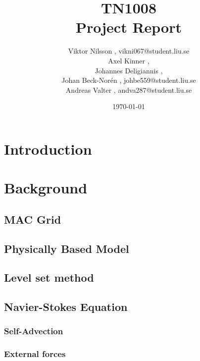 \documentclass[]{report}   %
\begin{document}
\title{TN1008\\ Project Report}   %
\author{
  Viktor Nilsson , vikni067@student.liu.se 
  \\Axel Kinner ,
  \\Johannes Deligiannis ,
  \\Johan Beck-Norén , johbe559@student.liu.se
  \\Andreas Valter , andva287@student.liu.se
	}
        \date{\today}    %
        \maketitle
        
\setcounter{page}{2}



\begingroup
\let\clearpage\relax %
\chapter{Introduction}


\chapter{Background}
\section{MAC Grid}

\section{Physically Based Model}

\section{Level set method}

\section{Navier-Stokes Equation}

\subsection{Self-Advection}

\subsection{External forces}

\end{document}
